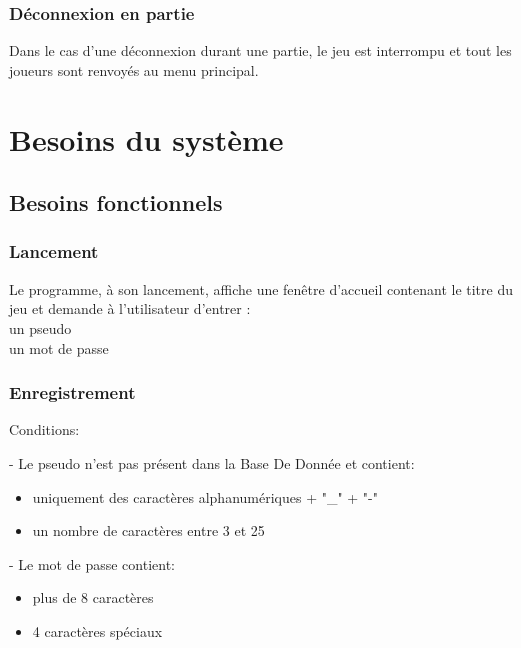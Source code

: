\documentclass[french, utf8]{article}
\begin{document}
\subsubsection{Déconnexion en partie}
Dans le cas d'une déconnexion durant une partie, le jeu est interrompu et tout les joueurs sont renvoyés au menu principal.

\section{Besoins du système}

\subsection{Besoins fonctionnels}
\subsubsection{Lancement}
\label{sec:Lancement}
Le programme, à son lancement,
affiche une fenêtre d'accueil contenant le titre du jeu et demande à l’utilisateur d'entrer :
\\un pseudo
\\un mot de passe


\subsubsection{Enregistrement}
\label{sec:Enregistrement}

Conditions:

- Le pseudo n'est pas présent dans la Base De Donnée et contient:
\begin{itemize}
\item uniquement des caractères alphanumériques + "\_" + "-"
\item un nombre de caractères entre 3 et 25
\end{itemize}

- Le mot de passe contient:
\begin{itemize}
\item plus de 8 caractères
\item 4 caractères spéciaux
\end{itemize}
\end{document}
